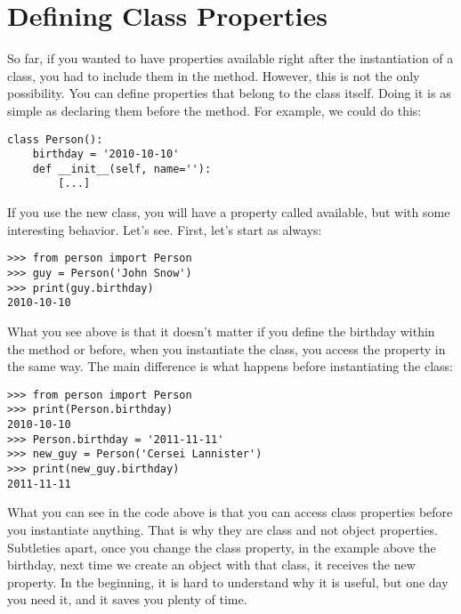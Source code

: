 
\section{Defining Class Properties}\label{sec:defining-class-properties}
So far, if you wanted to have properties available right after the instantiation of a class, you had to include them in the  method. However, this is not the only possibility. You can define properties that belong to the class itself. Doing it is as simple as declaring them before the  method. For example, we could do this:

\begin{verbatim}
class Person():
    birthday = '2010-10-10'
    def __init__(self, name=''):
        [...]
\end{verbatim}

If you use the new  class, you will have a property called  available, but with some interesting behavior. Let's see. First, let's start as always:

\begin{verbatim}
>>> from person import Person
>>> guy = Person('John Snow')
>>> print(guy.birthday)
2010-10-10
\end{verbatim}

What you see above is that it doesn't matter if you define the birthday within the  method or before, when you instantiate the class, you access the property in the same way. The main difference is what happens before instantiating the class:

\begin{verbatim}
>>> from person import Person
>>> print(Person.birthday)
2010-10-10
>>> Person.birthday = '2011-11-11'
>>> new_guy = Person('Cersei Lannister')
>>> print(new_guy.birthday)
2011-11-11
\end{verbatim}

What you can see in the code above is that you can access class properties before you instantiate anything. That is why they are class and not object properties. Subtleties apart, once you change the class property, in the example above the birthday, next time we create an object with that class, it receives the new property. In the beginning, it is hard to understand why it is useful, but one day you need it, and it saves you plenty of time.

